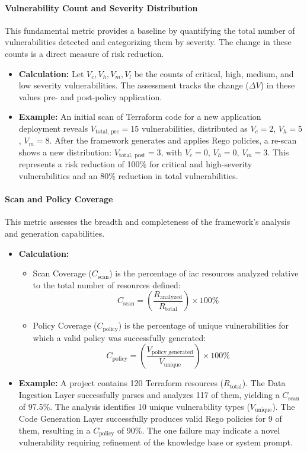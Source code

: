 \paragraph{Vulnerability Count and Severity Distribution} This fundamental metric provides a baseline by quantifying the total number of vulnerabilities detected and categorizing them by severity. The change in these counts is a direct measure of risk reduction.
\begin{itemize}
    \item \textbf{Calculation:} Let \( V_c, V_h, V_m, V_l \) be the counts of critical, high, medium, and low severity vulnerabilities. The assessment tracks the change (\( \Delta V \)) in these values pre- and post-policy application.
    \item \textbf{Example:} An initial scan of Terraform code for a new application deployment reveals \( V_{\text{total, pre}} = 15 \) vulnerabilities, distributed as \( V_c = 2 \), \( V_h = 5 \), \( V_m = 8 \). After the framework generates and applies Rego policies, a re-scan shows a new distribution: \( V_{\text{total, post}} = 3 \), with \( V_c = 0 \), \( V_h = 0 \), \( V_m = 3 \). This represents a risk reduction of 100\% for critical and high-severity vulnerabilities and an 80\% reduction in total vulnerabilities.
\end{itemize}

\paragraph{Scan and Policy Coverage} This metric assesses the breadth and completeness of the framework's analysis and generation capabilities.
\begin{itemize}
    \item \textbf{Calculation:}
        \begin{itemize}
            \item Scan Coverage (\( C_{\text{scan}} \)) is the percentage of \gls{iac} resources analyzed relative to the total number of resources defined:
            \[ C_{\text{scan}} = \left(\frac{R_{\text{analyzed}}}{R_{\text{total}}}\right) \times 100\% \]
            \item Policy Coverage (\( C_{\text{policy}} \)) is the percentage of unique vulnerabilities for which a valid policy was successfully generated:
            \[ C_{\text{policy}} = \left(\frac{V_{\text{policy\_generated}}}{V_{\text{unique}}}\right) \times 100\% \]
        \end{itemize}
    \item \textbf{Example:} A project contains 120 Terraform resources (\( R_{\text{total}} \)). The Data Ingestion Layer successfully parses and analyzes 117 of them, yielding a \( C_{\text{scan}} \) of 97.5\%. The analysis identifies 10 unique vulnerability types (\( V_{\text{unique}} \)). The Code Generation Layer successfully produces valid Rego policies for 9 of them, resulting in a \( C_{\text{policy}} \) of 90\%. The one failure may indicate a novel vulnerability requiring refinement of the knowledge base or system prompt.
\end{itemize}

